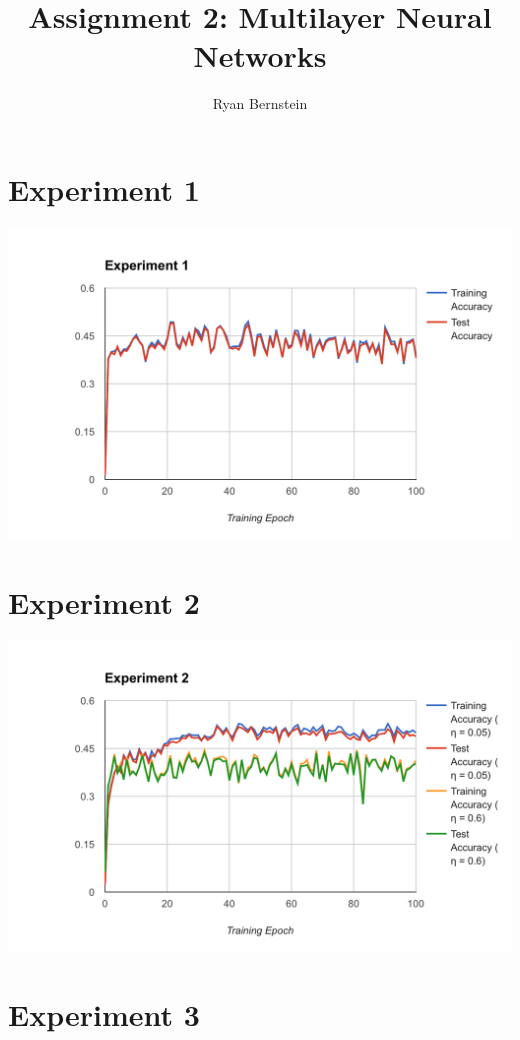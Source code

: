 \documentclass[11pt, oneside]{article}    %
\title{Assignment 2: Multilayer Neural Networks}
\author{Ryan Bernstein}
\begin{document}
\maketitle

\section*{Experiment 1}

\begin{center}
	\includegraphics[width=6in]{Exp1}
\end{center}

\section*{Experiment 2}

\begin{center}
	\includegraphics[width=6in]{Exp2}
\end{center}

\section*{Experiment 3}
\end{document}
